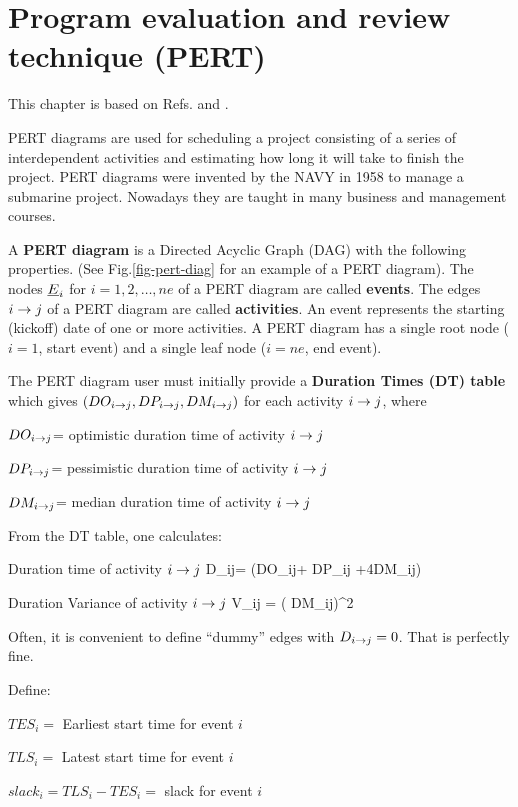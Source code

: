 \chapter{Program evaluation
 and review technique (PERT)}
This chapter is based on
Refs.\cite{ibook} and \cite{wiki-pert}.

PERT diagrams are 
used for scheduling a 
project consisting of a series
of interdependent activities
and estimating how
long it will take
to finish the project.
PERT diagrams were invented by the NAVY 
in 1958
to manage a submarine project.
Nowadays they are taught in many business 
and management courses.

A {\bf PERT diagram}
is a  Directed Acyclic Graph (DAG)
with the following properties. 
(See Fig.\ref{fig-pert-diag}
for an example of a PERT diagram).
The nodes ${\underline{E}}_i$ for $i=1, 2, \ldots, ne$ of a
PERT diagram are called {\bf events}.
 The edges $i\rightarrow j$ of a PERT diagram are called
 {\bf activities}.
An event represents the starting 
(kickoff) date of one or more
activities.
A PERT diagram has a 
single root node ($i=1$, start event)
and a single leaf node ($i=ne$, end event).

The PERT diagram user 
must initially 
provide a
{\bf Duration Times (DT) table} which gives $(DO_{i\rightarrow j}, 
DP_{i\rightarrow j}, DM_{i\rightarrow j})$ for each activity
$i\rightarrow j$, where

$DO_{i\rightarrow j}$= optimistic duration time 
of activity $i\rightarrow j$

$DP_{i\rightarrow j}$= pessimistic duration time 
of activity $i\rightarrow j$

$DM_{i\rightarrow j}$= median duration time 
of activity $i\rightarrow j$

From the DT table, one calculates:

Duration time of activity $i\rightarrow j$ 
\beq
D_{i\rarrow j}= (DO_{i\rarrow j}+
DP_{i\rarrow j} +4DM_{i\rarrow j})
\eeq

Duration Variance of activity $i\rightarrow j$
\beq
V_{i\rarrow j} = \left(
{DM_{i\rarrow j}}\right)^2
\eeq

Often,
it is convenient to define
\enquote{dummy} edges with $D_{i\rightarrow j}=0$.
That is perfectly fine.

Define:

$TES_i=$ Earliest start time for event $i$

$TLS_i=$ Latest start time for event $i$

$slack_i=TLS_i-TES_i=$ slack for event $i$

